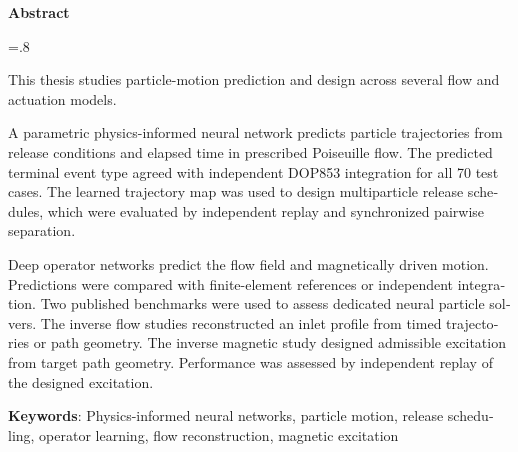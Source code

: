 

\begin{latin}

\begin{center}
\textbf{Abstract}
\end{center}
\baselineskip=.8\baselineskip

This thesis studies particle-motion prediction and design across several flow and actuation models.

A parametric physics-informed neural network predicts particle trajectories from release conditions and elapsed time in prescribed Poiseuille flow. The predicted terminal event type agreed with independent DOP853 integration for all 70 test cases. The learned trajectory map was used to design multiparticle release schedules, which were evaluated by independent replay and synchronized pairwise separation.

Deep operator networks predict the flow field and magnetically driven motion.
Predictions were compared with finite-element references or independent integration.
Two published benchmarks were used to assess dedicated neural particle solvers.
The inverse flow studies reconstructed an inlet profile from timed trajectories or path geometry.
The inverse magnetic study designed admissible excitation from target path geometry.
Performance was assessed by independent replay of the designed excitation.

\bigskip\noindent\textbf{Keywords}:
Physics-informed neural networks, particle motion, release scheduling, operator learning, flow reconstruction, magnetic excitation

\end{latin}
